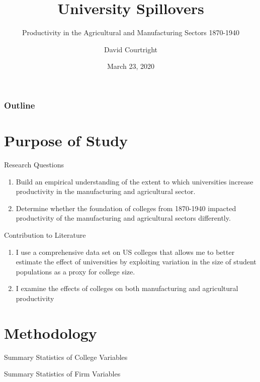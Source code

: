 \documentclass{beamer}
\title{University Spillovers}
\subtitle{Productivity in the Agricultural and Manufacturing Sectors 1870-1940}
\author{David Courtright}
\institute{Clemson University}
\date{March 23, 2020}
\begin{document}
\begin{frame}
\titlepage
\end{frame}

\begin{frame}
\frametitle{Outline}
\tableofcontents
\end{frame}

\section{Purpose of Study}
\begin{frame}{Research Questions}
\begin{enumerate}
\item Build an empirical understanding of the extent to which  universities increase productivity in the manufacturing and agricultural sector.
\item Determine whether the foundation of colleges from 1870-1940 impacted productivity of the manufacturing and agricultural sectors differently.
\end{enumerate}
\end{frame}

\begin{frame}{Contribution to Literature}
\begin{enumerate}
\item I use a comprehensive data set on US colleges that allows me to better estimate the effect of universities by exploiting variation in the size of student populations as a proxy for college size.
\item I examine the effects of colleges on both manufacturing and agricultural productivity
\end{enumerate}
\end{frame}

\section{Methodology}
\begin{frame}{Summary Statistics of College Variables}
\begin{threeparttable}
\centering
\footnotesize
\scalebox{.45}{}
\end{threeparttable}
\end{frame}

\begin{frame}{Summary Statistics of Firm Variables}
\begin{threeparttable}
\centering
\footnotesize
\scalebox{.44}{}
\end{threeparttable}
\end{frame}
\end{document}
